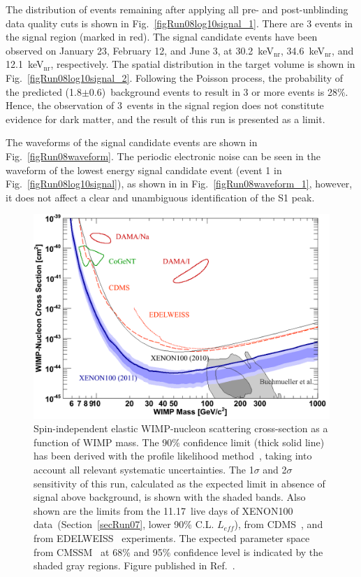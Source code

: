 The distribution of events remaining after applying all pre- and post-unblinding data quality cuts is shown in Fig.~\ref{figRun08log10signal_1}. There are 3 events in the signal region (marked in red). The signal candidate events have been observed on January 23, February 12, and June 3, at 30.2~keV$_{\mathrm{nr}}$, 34.6~keV$_{\mathrm{nr}}$, and 12.1~keV$_{\mathrm{nr}}$, respectively. The spatial distribution in the target volume is shown in Fig.~\ref{figRun08log10signal_2}. 
Following the Poisson process, the probability  of the predicted (1.8$\pm$0.6)~background events to result in 3 or more events is 28\%. Hence, the observation of 3~events in the signal region does not constitute evidence for dark matter, and the result of this run is presented as a limit.

The waveforms of the signal candidate events are shown in Fig.~\ref{figRun08waveform}. The periodic electronic noise can be seen in the waveform of the lowest energy signal candidate event (event 1 in Fig.~\ref{figRun08log10signal}), as shown in in Fig.~\ref{figRun08waveform_1}, however, it does not affect a clear and unambiguous identification of the S1 peak. 

\begin{figure}[!b]
\centering
\includegraphics[width=0.6\linewidth]{plots/run08/run08_limit_mod.png}
\caption[Exclusion limit on spin-independent WIMP-nucleon scattering cross-section from the first science run]{Spin-independent elastic WIMP-nucleon scattering cross-section as a function of WIMP mass. The 90\% confidence limit (thick solid line) has been derived with the profile likelihood method~\cite{ProfileLikelihood}, taking into account all relevant systematic uncertainties. The 1$\sigma$ and 2$\sigma$ sensitivity of this run, calculated as the expected limit in absence of signal above background, is shown with the shaded bands. Also shown are the limits from the 11.17~live days of XENON100 data~(Section~\ref{secRun07}, lower 90\% C.L. $L_{eff}$), from CDMS~\cite{CDMS_limit}, and from EDELWEISS~\cite{EDELWEISS_limit} experiments. The expected parameter space from CMSSM~\cite{LHC} at 68\% and 95\% confidence level is indicated by the shaded gray regions. Figure published in Ref.~\cite{xe100-run08}.}
\label{figRun08limit}
\end{figure}

